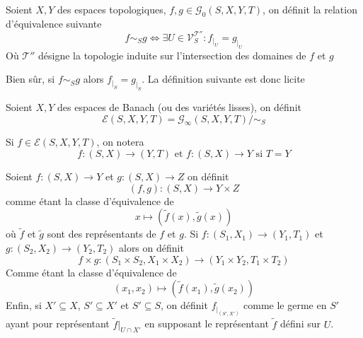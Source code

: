 \documentclass[memoire.tex]{subfiles}
\begin{document}
\begin{definition}
    Soient $X,Y$ des espaces topologiques, $f,g\in \mathcal{G}_0(S,X,Y,T)$, on définit la relation d'équivalence suivante
    \begin{equation*}
        f\sim_{S} g \Leftrightarrow \exists U\in
        \mathcal{V}^{\mathcal{T}''}_{S} : f_{|_{U}}=g_{|_{U}}
    \end{equation*}
Où $\mathcal{T}''$ désigne la topologie induite sur l'intersection des domaines de $f$ et $g$
\end{definition}
 Bien sûr, si $f\sim_{S} g$ alors $f_{|_{S}}=g_{|_{S}}$. La définition suivante est donc licite
\begin{definition}
    Soient $X,Y$ des espaces de Banach (ou des variétés lisses), on définit 
    \begin{equation*}
        \mathcal{E}(S,X,Y,T)=\mathcal{G}_{\infty}(S,X,Y,T)/\sim_{S}
    \end{equation*}
\end{definition}
Si $f\in\mathcal{E}(S,X,Y,T)$, on notera
\begin{equation*}
    f : (S,X)\rightarrow (Y,T)\text{ et }f : (S,X)\rightarrow Y\text{ si }T=Y
\end{equation*}
\begin{definition}
    Soient $f:(S,X)\rightarrow Y$ et $g:(S,X)\rightarrow Z$
    on définit 
    \begin{equation*}
       (f,g): (S,X)\rightarrow Y\times Z 
    \end{equation*}
    comme étant la classe d'équivalence de 
    \begin{equation*}
        x\mapsto (\tilde{f}(x),\tilde{g}(x))
    \end{equation*}
    où $\tilde{f}$ et $\tilde{g}$ sont des représentants de $f$ et $g$.
    Si $f:(S_1,X_1)\rightarrow (Y_1,T_1)$ et $g:(S_2,X_2)\rightarrow (Y_2,T_2)$
    alors on définit 
    \begin{equation*}
        f\times g: (S_1\times S_2,X_1\times X_2)\rightarrow 
        (Y_1\times Y_2,T_1\times T_2)
    \end{equation*}
    Comme étant la classe d'équivalence de
    \begin{equation*}
        (x_1,x_2)\mapsto (\tilde{f}(x_1),\tilde{g}(x_2))
    \end{equation*}
    Enfin, si $X'\subseteq X$,  $S'\subseteq X'$ et $S'\subseteq S$, on définit $f_{|_{(S',X')}}$ comme le germe en $S'$ ayant pour représentant $\tilde{f}|_{U\cap X'}$ en supposant le représentant $\tilde{f}$ défini sur $U$.
\end{definition}
\end{document}
